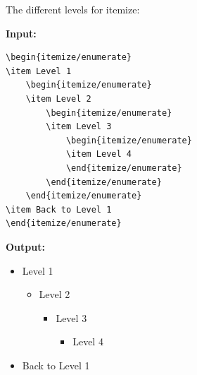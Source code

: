 \documentclass{article}
\begin{document}
The different levels for itemize:
\begin{multicols}{2}
\begin{minipage}{\linewidth}
\textbf{Input:} \\
\begin{verbatim}
\begin{itemize/enumerate}
\item Level 1 
    \begin{itemize/enumerate} 
    \item Level 2 
        \begin{itemize/enumerate} 
        \item Level 3 
            \begin{itemize/enumerate}
            \item Level 4 
            \end{itemize/enumerate} 
        \end{itemize/enumerate} 
    \end{itemize/enumerate} 
\item Back to Level 1 
\end{itemize/enumerate} 
\end{verbatim}
\end{minipage}

    \begin{minipage}{\linewidth}
        \textbf{Output:} \\
        \begin{itemize}
            \item Level 1
            \begin{itemize}
                \item Level 2
                \begin{itemize}
                    \item Level 3
                    \begin{itemize}
                        \item Level 4
                    \end{itemize}
                \end{itemize}
            \end{itemize}
            \item Back to Level 1
        \end{itemize}
    \end{minipage}
\end{multicols}
\end{document}
